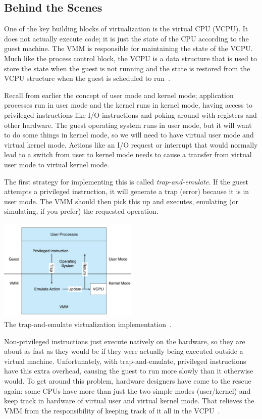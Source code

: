 \subsection*{Behind the Scenes}

One of the key building blocks of virtualization is the virtual CPU (VCPU). It does not actually execute code; it is just the state of the CPU according to the guest machine. The VMM is responsible for maintaining the state of the VCPU. Much like the process control block, the VCPU is a data structure that is used to store the state when the guest is not running and the state is restored from the VCPU structure when the guest is scheduled to run~\cite{osc}.

Recall from earlier the concept of user mode and kernel mode; application processes run in user mode and the kernel runs in kernel mode, having access to privileged instructions like I/O instructions and poking around with registers and other hardware. The guest operating system runs in user mode, but it will want to do some things in kernel mode, so we will need to have virtual user mode and virtual kernel mode. Actions like an I/O request or interrupt that would normally lead to a switch from user to kernel mode needs to cause a transfer from virtual user mode to virtual kernel mode.

The first strategy for implementing this is called \textit{trap-and-emulate}. If the guest attempts a privileged instruction, it will generate a trap (error) because it is in user mode. The VMM should then pick this up and executes, emulating (or simulating, if you prefer) the requested operation.

\begin{center}
	\includegraphics[width=0.5\textwidth]{images/trap-and-emulate.png}\\
	The trap-and-emulate virtualization implementation~\cite{osc}.
\end{center}

Non-privileged instructions just execute natively on the hardware, so they are about as fast as they would be if they were actually being executed outside a virtual machine. Unfortunately, with trap-and-emulate, privileged instructions have this extra overhead, causing the guest to run more slowly than it otherwise would. To get around this problem, hardware designers have come to the rescue again: some CPUs have more than just the two simple modes (user/kernel) and keep track in hardware of virtual user and virtual kernel mode. That relieves the VMM from the responsibility of keeping track of it all in the VCPU~\cite{osc}.

